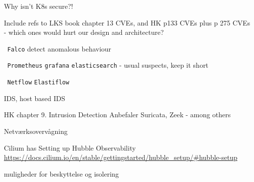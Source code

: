 \documentclass[Screen16to9,17pt]{foils}
\begin{document}

Why isn't K8s secure?!
\begin{list2}
\item Include refs to LKS book chapter 13 CVEs, and HK p133 CVEs plus p 275 CVEs
- which ones would hurt our design and architecture?
\end{list2}


\begin{list2}
\item \faWrench\ \verb+Falco+ detect anomalous behaviour
\item \faWrench\ \verb+Prometheus+ \verb+grafana+ \verb+elasticsearch+ - usual suspects, keep it short
\item \faWrench\ \verb+Netflow+ \verb+Elastiflow+
\end{list2}


\begin{list2}
\item IDS, host based IDS
\item HK chapter 9. Intrusion Detection
Anbefaler Suricata, Zeek - among others
\end{list2}



\begin{list2}
\item
\end{list2}


\begin{list2}
\item Netværksovervågning
\item Cilium has Setting up Hubble Observability \\
\url{https://docs.cilium.io/en/stable/gettingstarted/hubble_setup/#hubble-setup}
\end{list2}


\begin{list2}
\item muligheder for beskyttelse og isolering
\end{list2}


\end{document}
